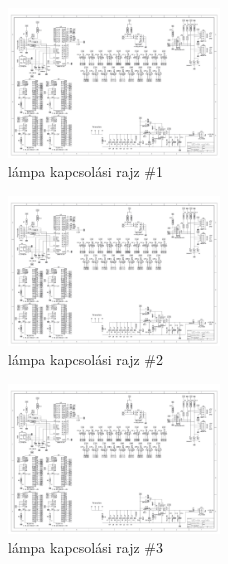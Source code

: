 \documentclass[tocnopagenum]{thesis-ekf}
\theoremstyle{definition}
\theoremstyle{remark}
\begin{document}
	\begin{figure}[t]
	
		\centering
		\includegraphics[page=1,width=0.5\textwidth]{SLL}
		
		\caption{lámpa kapcsolási rajz \#1}
			\label{fig:lamp1}
	
	\end{figure}
	\begin{figure}[t]
	
		\centering
		\includegraphics[page=2,width=0.5\textwidth]{SLL}
		
		\caption{lámpa kapcsolási rajz \#2}
		\label{fig:lamp2}
	
	\end{figure}
	\begin{figure}[t]
		
		\centering
		\includegraphics[page=3,width=0.5\textwidth]{SLL}
		
		\caption{lámpa kapcsolási rajz \#3}
		\label{fig:lamp3}
	
	\end{figure}
\par
\end{document}
